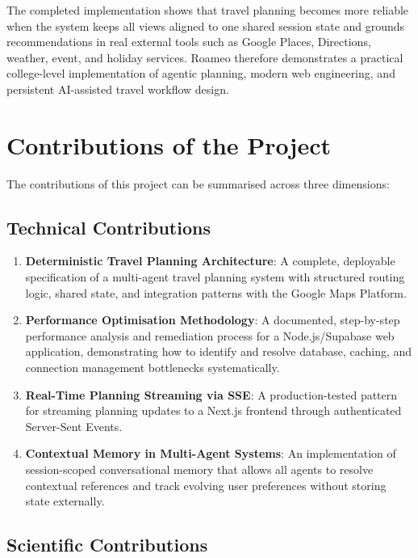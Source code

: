 \documentclass[12pt,a4paper]{report}
\begin{document}
The completed implementation shows that travel planning becomes more reliable when the system keeps all views aligned to one shared session state and grounds recommendations in real external tools such as Google Places, Directions, weather, event, and holiday services. Roameo therefore demonstrates a practical college-level implementation of agentic planning, modern web engineering, and persistent AI-assisted travel workflow design.

\section{Contributions of the Project}

The contributions of this project can be summarised across three dimensions:

\subsection{Technical Contributions}

\begin{enumerate}[nosep]
  \item \textbf{Deterministic Travel Planning Architecture}: A complete, deployable specification of a multi-agent travel planning system with structured routing logic, shared state, and integration patterns with the Google Maps Platform.
  \item \textbf{Performance Optimisation Methodology}: A documented, step-by-step performance analysis and remediation process for a Node.js/Supabase web application, demonstrating how to identify and resolve database, caching, and connection management bottlenecks systematically.
  \item \textbf{Real-Time Planning Streaming via SSE}: A production-tested pattern for streaming planning updates to a Next.js frontend through authenticated Server-Sent Events.
  \item \textbf{Contextual Memory in Multi-Agent Systems}: An implementation of session-scoped conversational memory that allows all agents to resolve contextual references and track evolving user preferences without storing state externally.
\end{enumerate}

\subsection{Scientific Contributions}
\end{document}
